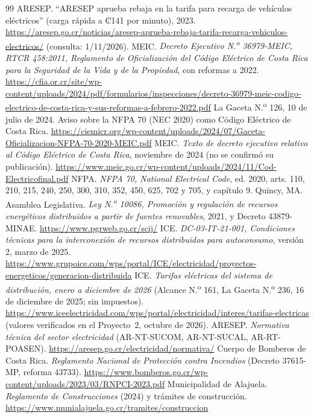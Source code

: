 \begin{thebibliography}{99}
 ARESEP. ``ARESEP aprueba rebaja en la tarifa para recarga de vehículos eléctricos'' (carga rápida a ₡141 por minuto), 2023. \url{https://aresep.go.cr/noticias/aresep-aprueba-rebaja-tarifa-recarga-vehiculos-electricos/} (consulta: 1/11/2026).
 MEIC. \emph{Decreto Ejecutivo N.\textsuperscript{o} 36979-MEIC, RTCR 458:2011, Reglamento de Oficialización del Código Eléctrico de Costa Rica para la Seguridad de la Vida y de la Propiedad}, con reformas a 2022. \url{https://cfia.or.cr/site/wp-content/uploads/2024/pdf/formularios/inspecciones/decreto-36979-meic-codigo-electrico-de-costa-rica-y-sus-reformas-a-febrero-2022.pdf}
 La Gaceta N.\textsuperscript{o} 126, 10 de julio de 2024. Aviso sobre la NFPA 70 (NEC 2020) como Código Eléctrico de Costa Rica. \url{https://ciemicr.org/wp-content/uploads/2024/07/Gaceta-Oficializacion-NFPA-70-2020-MEIC.pdf}
 MEIC. \emph{Texto de decreto ejecutivo relativo al Código Eléctrico de Costa Rica}, noviembre de 2024 (no se confirmó su publicación). \url{https://www.meic.go.cr/wp-content/uploads/2024/11/Cod-Electricofinal.pdf}
 NFPA. \emph{NFPA 70, National Electrical Code}, ed. 2020, arts. 110, 210, 215, 240, 250, 300, 310, 352, 450, 625, 702 y 705, y capítulo 9. Quincy, MA.
 Asamblea Legislativa. \emph{Ley N.\textsuperscript{o} 10086, Promoción y regulación de recursos energéticos distribuidos a partir de fuentes renovables}, 2021, y Decreto 43879-MINAE. \url{https://www.pgrweb.go.cr/scij/}
 ICE. \emph{DC-03-IT-21-001, Condiciones técnicas para la interconexión de recursos distribuidos para autoconsumo}, versión 2, marzo de 2025. \url{https://www.grupoice.com/wps/portal/ICE/electricidad/proyectos-energeticos/generacion-distribuida}
 ICE. \emph{Tarifas eléctricas del sistema de distribución, enero a diciembre de 2026} (Alcance N.\textsuperscript{o} 161, La Gaceta N.\textsuperscript{o} 236, 16 de diciembre de 2025; sin impuestos). \url{https://www.iceelectricidad.com/wps/portal/electricidad/interes/tarifas-electricas} (valores verificados en el Proyecto~2, octubre de 2026).
 ARESEP. \emph{Normativa técnica del sector electricidad} (AR-NT-SUCOM, AR-NT-SUCAL, AR-RT-POASEN). \url{https://aresep.go.cr/electricidad/normativa/}
 Cuerpo de Bomberos de Costa Rica. \emph{Reglamento Nacional de Protección contra Incendios} (Decreto 37615-MP, reforma 43733). \url{https://www.bomberos.go.cr/wp-content/uploads/2023/03/RNPCI-2023.pdf}
 Municipalidad de Alajuela. \emph{Reglamento de Construcciones} (2024) y trámites de construcción. \url{https://www.munialajuela.go.cr/tramites/construccion}

\end{thebibliography}
